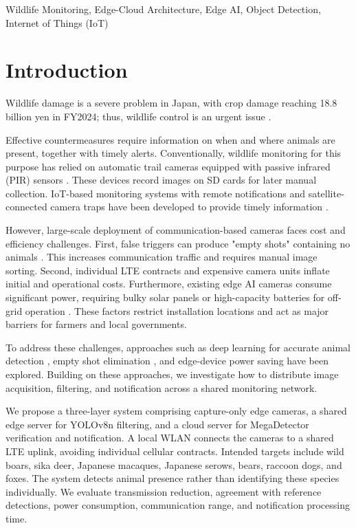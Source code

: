\documentclass[conference]{IEEEtran}
\begin{document}
\begin{IEEEkeywords}
Wildlife Monitoring, Edge-Cloud Architecture, Edge AI, Object Detection, Internet of Things (IoT)
\end{IEEEkeywords}

\section{Introduction}
Wildlife damage is a severe problem in Japan, with crop damage reaching 18.8 billion yen in FY2024; thus, wildlife control is an urgent issue \cite{maff}.

Effective countermeasures require information on when and where animals are present, together with timely alerts. Conventionally, wildlife monitoring for this purpose has relied on automatic trail cameras equipped with passive infrared (PIR) sensors \cite{Tabak2019,Beery2019,rs18030502}. These devices record images on SD cards for later manual collection. IoT-based monitoring systems with remote notifications and satellite-connected camera traps have been developed to provide timely information \cite{Whytock2023,Patkar2025,9345858}.

However, large-scale deployment of communication-based cameras faces cost and efficiency challenges. First, false triggers can produce "empty shots" containing no animals \cite{Beery2019}. This increases communication traffic and requires manual image sorting. Second, individual LTE contracts and expensive camera units inflate initial and operational costs. Furthermore, existing edge AI cameras consume significant power, requiring bulky solar panels or high-capacity batteries for off-grid operation \cite{Sato2022}. These factors restrict installation locations and act as major barriers for farmers and local governments.

To address these challenges, approaches such as deep learning for accurate animal detection \cite{10394750,10126065}, empty shot elimination \cite{Tabak2019,Beery2019,VELASCOMONTERO2024102815}, and edge-device power saving \cite{IEICE2020,Sato2022,VELASCOMONTERO2024102815} have been explored. Building on these approaches, we investigate how to distribute image acquisition, filtering, and notification across a shared monitoring network.

We propose a three-layer system comprising capture-only edge cameras, a shared edge server for YOLOv8n filtering, and a cloud server for MegaDetector verification and notification. A local WLAN connects the cameras to a shared LTE uplink, avoiding individual cellular contracts. Intended targets include wild boars, sika deer, Japanese macaques, Japanese serows, bears, raccoon dogs, and foxes. The system detects animal presence rather than identifying these species individually. We evaluate transmission reduction, agreement with reference detections, power consumption, communication range, and notification processing time.
\end{document}
